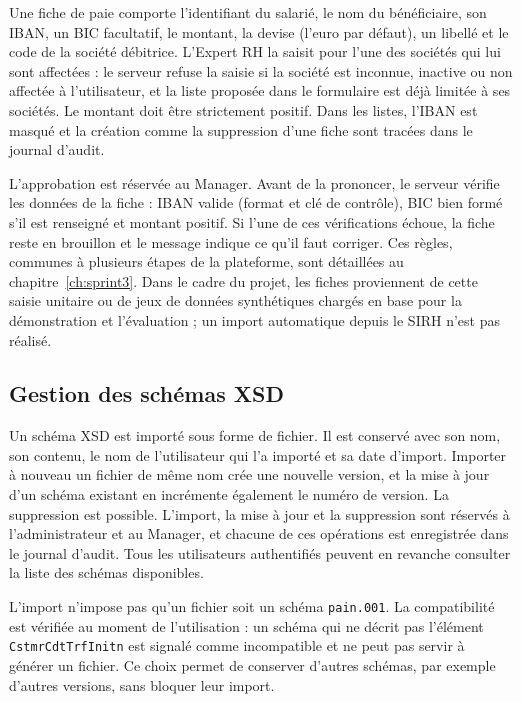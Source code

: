Une fiche de paie comporte l'identifiant du salarié, le nom du bénéficiaire, son IBAN, un BIC facultatif, le montant, la devise (l'euro par défaut), un libellé et le code de la société débitrice. L'Expert RH la saisit pour l'une des sociétés qui lui sont affectées : le serveur refuse la saisie si la société est inconnue, inactive ou non affectée à l'utilisateur, et la liste proposée dans le formulaire est déjà limitée à ses sociétés. Le montant doit être strictement positif. Dans les listes, l'IBAN est masqué et la création comme la suppression d'une fiche sont tracées dans le journal d'audit.

L'approbation est réservée au Manager. Avant de la prononcer, le serveur vérifie les données de la fiche : IBAN valide (format et clé de contrôle), BIC bien formé s'il est renseigné et montant positif. Si l'une de ces vérifications échoue, la fiche reste en brouillon et le message indique ce qu'il faut corriger. Ces règles, communes à plusieurs étapes de la plateforme, sont détaillées au chapitre~\ref{ch:sprint3}. Dans le cadre du projet, les fiches proviennent de cette saisie unitaire ou de jeux de données synthétiques chargés en base pour la démonstration et l'évaluation ; un import automatique depuis le SIRH n'est pas réalisé.

\subsection{Gestion des schémas XSD}

Un schéma XSD est importé sous forme de fichier. Il est conservé avec son nom, son contenu, le nom de l'utilisateur qui l'a importé et sa date d'import. Importer à nouveau un fichier de même nom crée une nouvelle version, et la mise à jour d'un schéma existant en incrémente également le numéro de version. La suppression est possible. L'import, la mise à jour et la suppression sont réservés à l'administrateur et au Manager, et chacune de ces opérations est enregistrée dans le journal d'audit. Tous les utilisateurs authentifiés peuvent en revanche consulter la liste des schémas disponibles.

L'import n'impose pas qu'un fichier soit un schéma \texttt{pain.001}. La compatibilité est vérifiée au moment de l'utilisation : un schéma qui ne décrit pas l'élément \texttt{CstmrCdtTrfInitn} est signalé comme incompatible et ne peut pas servir à générer un fichier. Ce choix permet de conserver d'autres schémas, par exemple d'autres versions, sans bloquer leur import.

